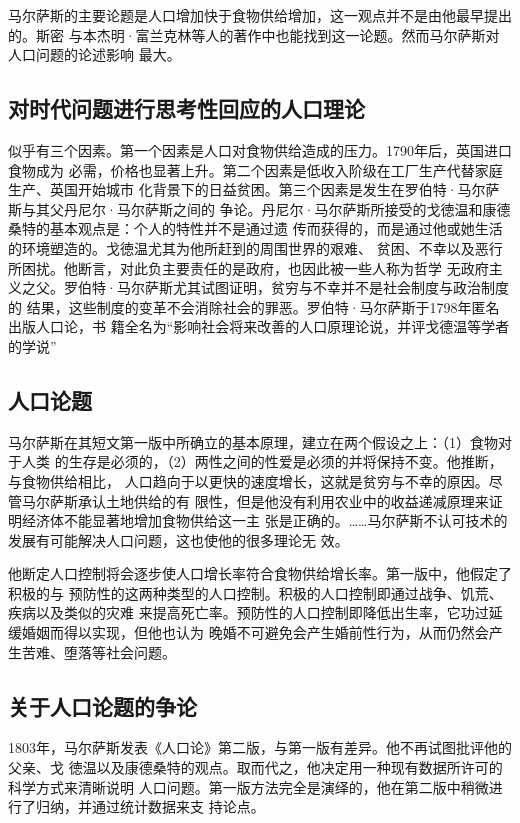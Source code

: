 马尔萨斯的主要论题是人口增加快于食物供给增加，这一观点并不是由他最早提出的。斯密
与本杰明·富兰克林等人的著作中也能找到这一论题。然而马尔萨斯对人口问题的论述影响
最大。

\subsection{对时代问题进行思考性回应的人口理论}

似乎有三个因素。第一个因素是人口对食物供给造成的压力。1790年后，英国进口食物成为
必需，价格也显著上升。第二个因素是低收入阶级在工厂生产代替家庭生产、英国开始城市
化背景下的日益贫困。第三个因素是发生在罗伯特·马尔萨斯与其父丹尼尔·马尔萨斯之间的
争论。丹尼尔·马尔萨斯所接受的戈徳温和康德桑特的基本观点是：个人的特性并不是通过遗
传而获得的，而是通过他或她生活的环境塑造的。戈徳温尤其为他所赶到的周围世界的艰难、
贫困、不幸以及恶行所困扰。他断言，对此负主要责任的是政府，也因此被一些人称为哲学
无政府主义之父。罗伯特·马尔萨斯尤其试图证明，贫穷与不幸并不是社会制度与政治制度的
结果，这些制度的变革不会消除社会的罪恶。罗伯特·马尔萨斯于1798年匿名出版人口论，书
籍全名为“影响社会将来改善的人口原理论说，并评戈德温等学者的学说”

\subsection{人口论题}

马尔萨斯在其短文第一版中所确立的基本原理，建立在两个假设之上：（1）食物对于人类
的生存是必须的，（2）两性之间的性爱是必须的并将保持不变。他推断，与食物供给相比，
人口趋向于以更快的速度增长，这就是贫穷与不幸的原因。尽管马尔萨斯承认土地供给的有
限性，但是他没有利用农业中的收益递减原理来证明经济体不能显著地增加食物供给这一主
张是正确的。……马尔萨斯不认可技术的发展有可能解决人口问题，这也使他的很多理论无
效。

他断定人口控制将会逐步使人口增长率符合食物供给增长率。第一版中，他假定了积极的与
预防性的这两种类型的人口控制。积极的人口控制即通过战争、饥荒、疾病以及类似的灾难
来提高死亡率。预防性的人口控制即降低出生率，它功过延缓婚姻而得以实现，但他也认为
晚婚不可避免会产生婚前性行为，从而仍然会产生苦难、堕落等社会问题。

\subsection{关于人口论题的争论}

1803年，马尔萨斯发表《人口论》第二版，与第一版有差异。他不再试图批评他的父亲、戈
徳温以及康德桑特的观点。取而代之，他决定用一种现有数据所许可的科学方式来清晰说明
人口问题。第一版方法完全是演绎的，他在第二版中稍微进行了归纳，并通过统计数据来支
持论点。

